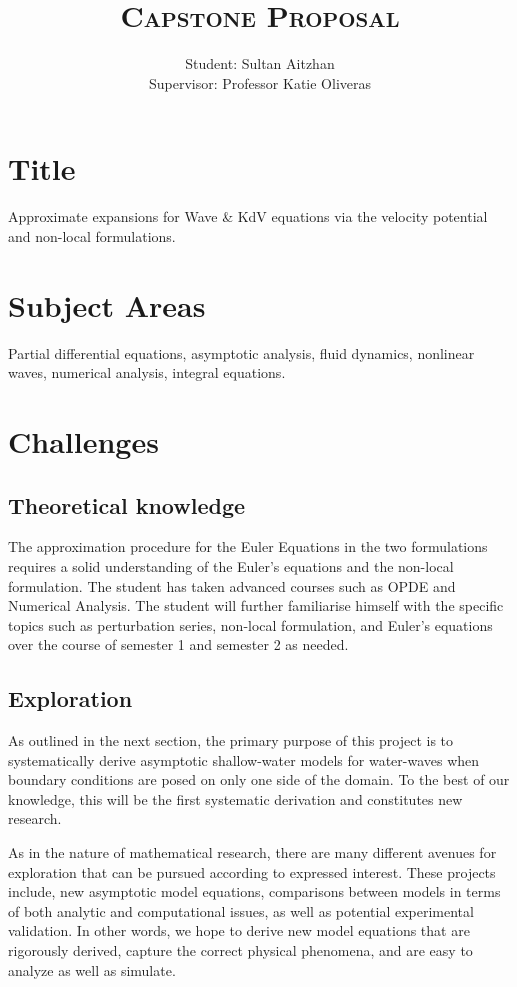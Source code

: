 \documentclass[10pt, oneside, a4paper]{article}
\author{
    Student: Sultan Aitzhan\\
    Supervisor: Professor Katie Oliveras
    }
\title{\textsc{Capstone Proposal}}
\date{\vspace{-5ex}}
\begin{document}
\maketitle

\thispagestyle{fancy}


\section{Title}
Approximate expansions for Wave \& KdV equations via the velocity potential and non-local formulations.

\section{Subject Areas}
Partial differential equations, asymptotic analysis, fluid dynamics, nonlinear waves, numerical analysis, integral equations.

\section{Challenges}
\subsection{Theoretical knowledge}
The approximation procedure for the Euler Equations in the two formulations requires a solid understanding of the Euler's equations and the non-local formulation. The student has taken advanced courses such as OPDE and Numerical Analysis. The student will further familiarise himself with the specific topics such as perturbation series, non-local formulation, and Euler's equations over the course of semester 1 and semester 2 as needed.

\subsection{Exploration}
As outlined in the next section, the primary purpose of this project is to systematically derive asymptotic shallow-water models for water-waves when boundary conditions are posed on only one side of the domain.  To the best of our knowledge, this will be the first systematic derivation and constitutes new research. 

As in the nature of mathematical research, there are many different avenues for exploration that can be pursued according to expressed interest.  These projects include, new asymptotic model equations, comparisons between models in terms of both analytic and computational issues, as well as potential experimental validation. In other words, we hope to derive new model equations that are rigorously derived, capture the correct physical phenomena, and are easy to analyze as well as simulate.
\end{document}
